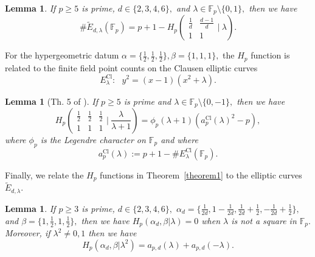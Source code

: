 \documentclass[12pt]{amsart}
\newtheorem{lemma}[theorem]{Lemma}
\theoremstyle{definition}
\theoremstyle{remark}
\numberwithin{equation}{section}
\def\F{{\mathbb F}}
\def\F{\mathbb{F}}
\DeclareMathOperator{\Cl}{Cl}
\begin{document}
\begin{lemma}\cite{Koike, BCM, HLLT}\label{generalizedKoike}
    If $p\geq5$ is prime, $d\in\{2,3,4,6\},$ and $\lambda\in\F_p\setminus\{0,1\},$ then we have
    $$
    \#\widetilde{E}_{d,\lambda}(\F_p)=p+1-H_p\left(\begin{array}{cc}
    \frac{1}{d} & \frac{d-1}{d}  \\
     1 & 1
\end{array}\bigg|\ \lambda\right).
    $$
\end{lemma}

For the hypergeometric datum $\alpha=\{\frac{1}{2},\frac{1}{2},\frac{1}{2}\}, \beta=\{1,1,1\},$ the $H_p$ function is related to the finite field point counts on the Clausen elliptic curves
$$
E_\lambda^{\Cl}:\ \ \ y^2 = (x-1)(x^2+\lambda).
$$

\begin{lemma}[Th. 5 of \cite{EC5}]\label{hypergeometricClausen}
    If $p\geq 5$ is prime and $\lambda\in\F_p\setminus\{0,-1\},$ then we have
    $$
    H_p\left(\begin{array}{ccc}
    \frac{1}{2} & \frac{1}{2} & \frac{1}{2}  \\
     1 & 1 & 1
\end{array}\bigg|\ \frac{\lambda}{\lambda+1}\right) = \phi_p(\lambda+1)(a_p^{\Cl}(\lambda)^2-p),
    $$
    where $\phi_p$ is the Legendre character on $\F_p$ and where
    $$
    a_p^{\Cl}(\lambda):=p+1-\#E_\lambda^{\Cl}(\F_p).
    $$
\end{lemma}

Finally, we relate the $H_p$ functions in Theorem~\ref{theorem1} to the elliptic curves $\widetilde{E}_{d,\lambda}.$

\begin{lemma}\label{HpLegendreRelation}
    If $p\geq 3$ is prime, $d\in\{2,3,4,6\},$ $\alpha_d=\{\frac{1}{2d},1-\frac{1}{2d},\frac{1}{2d}+\frac{1}{2},-\frac{1}{2d}+\frac{1}{2}\},$ and $\beta=\{1,\frac{1}{2},1,\frac{1}{2}\},$ then we have $H_p(\alpha_d,\beta|\lambda)=0$ when $\lambda$ is not a square in $\F_p.$ Moreover, if $\lambda^2\neq 0,1$ then we have
    \begin{equation}\label{HGFEC}
    H_p\left(\alpha_d,\beta|\lambda^2\right)= a_{p,d}(\lambda)+a_{p,d}(-\lambda).
    \end{equation}
\end{lemma}
\end{document}
